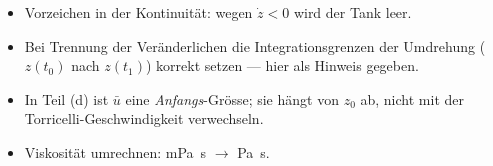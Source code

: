 \begin{achtung}
\begin{itemize}
  \item Vorzeichen in der Kontinuität: wegen $\dot z<0$ wird der Tank leer.
  \item Bei Trennung der Veränderlichen die Integrationsgrenzen der Umdrehung
       ($z(t_0)$ nach $z(t_1)$) korrekt setzen --- hier als Hinweis gegeben.
  \item In Teil (d) ist $\bar u$ eine \emph{Anfangs}-Grösse; sie hängt von $z_0$
       ab, nicht mit der Torricelli-Geschwindigkeit verwechseln.
  \item Viskosität umrechnen: \unit{\milli\pascal\second}
       $\to$ \unit{\pascal\second}.
\end{itemize}
\end{achtung}

